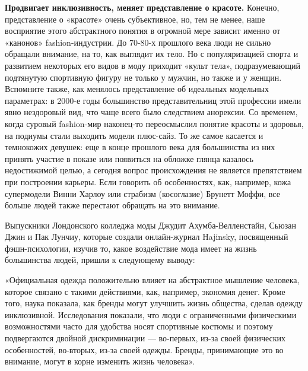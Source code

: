 \textbf{Продвигает инклюзивность, меняет представление о красоте.}
Конечно, представление о «красоте» очень субъективное, но, тем не менее, наше восприятие этого абстрактного понятия в огромной мере зависит именно от «канонов» fashion-индустрии. До 70-80-х прошлого века люди не сильно обращали внимание, на то, как выглядит их тело. Но с популяризацией спорта и развитием некоторых его видов в моду приходит «культ тела», подразумевающий подтянутую спортивную фигуру не только у мужчин, но также и у женщин. Вспомните также, как менялось представление об идеальных модельных параметрах: в 2000-е годы большинство представительниц этой профессии имели явно нездоровый вид, что чаще всего было следствием анорексии. Со временем, когда суровый fashion-мир наконец-то переосмыслил понятие красоты и здоровья, на подиумы стали выходить модели плюс-сайз. То же самое касается и темнокожих девушек: еще в конце прошлого века для большинства из них принять участие в показе или появиться на обложке глянца казалось недостижимой целью, а сегодня вопрос происхождения не является препятствием при построении карьеры. Если говорить об особенностях, как, например, кожа супермодели Винни Харлоу или страбизм (косоглазие) Брунетт Моффи, все больше людей также перестают обращать на это внимание.

Выпускники Лондонского колледжа моды Джудит Ахумба-Велленстайн, Сьюзан Джин и Пак Лунчиу, которые создали онлайн-журнал Hajinsky, посвященный фэшн-психологии, изучив то, какое воздействие мода имеет на жизнь большинства людей, пришли к следующему выводу:

\begin{fancyquotes}
    «Официальная одежда положительно влияет на абстрактное мышление человека, которое связано с такими действиями, как, например, экономия денег. Кроме того, наука показала, как бренды могут улучшить жизнь общества, сделав одежду инклюзивной. Исследования показали, что люди с ограниченными физическими возможностями часто для удобства носят спортивные костюмы и поэтому подвергаются двойной дискриминации — во-первых, из-за своей физических особенностей, во-вторых, из-за своей одежды. Бренды, принимающие это во внимание, могут в корне изменить жизнь человека».
\end{fancyquotes}

